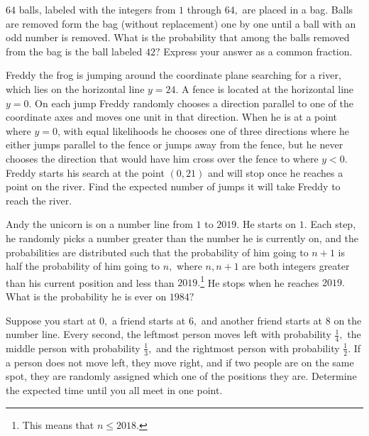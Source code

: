 \documentclass{article}
\begin{document}
\begin{req}{6}
$64$ balls, labeled with the integers from $1$ through $64,$ are placed in a bag. Balls are removed form the bag (without replacement) one by one until a ball with an odd number is removed. What is the probability that among the balls removed from the bag is the ball labeled $42?$ Express your answer as a common fraction.
\end{req}

\begin{prob}[AIME I 2016/13]{6}
Freddy the frog is jumping around the coordinate plane searching for a river, which lies on the horizontal line $y = 24$. A fence is located at the horizontal line $y = 0$. On each jump Freddy randomly chooses a direction parallel to one of the coordinate axes and moves one unit in that direction. When he is at a point where $y=0$, with equal likelihoods he chooses one of three directions where he either jumps parallel to the fence or jumps away from the fence, but he never chooses the direction that would have him cross over the fence to where $y < 0$. Freddy starts his search at the point $(0, 21)$ and will stop once he reaches a point on the river. Find the expected number of jumps it will take Freddy to reach the river.
\end{prob}


\begin{prob}{9}
Andy the unicorn is on a number line from $1$ to $2019.$ He starts on $1.$ Each step, he randomly picks a number greater than the number he is currently on, and the probabilities are distributed such that the probability of him going to $n+1$ is half the probability of him going to $n,$ where $n,n+1$ are both integers greater than his current position and less than $2019.$\footnote{This means that $n\leq 2018.$} He stops when he reaches $2019.$ What is the probability he is ever on $1984?$
\end{prob}

\begin{prob}{13}
 Suppose you start at $0,$ a friend starts at $6,$ and another friend starts at $8$ on the number line. Every second, the leftmost person moves left with probability $\frac{1}{4},$ the middle person with probability $\frac{1}{3},$ and the rightmost person with probability $\frac{1}{2}.$ If a person does not move left, they move right, and if two people are on the same spot, they are randomly assigned which one of the positions they are. Determine the expected time until you all meet in one point.
\end{prob}
\end{document}

